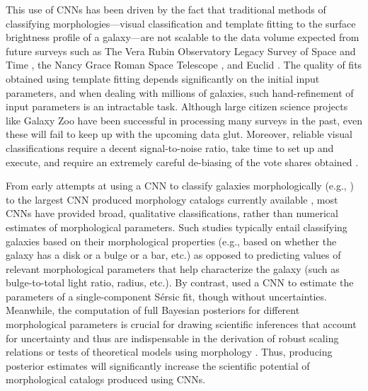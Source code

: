 \documentclass[twocolumn]{aastex63}
\newcommand\sersic{S\'ersic}
\begin{document}
\begin{CJK*}{UTF8}{gbsn}
This use of CNNs has been driven by the fact that traditional methods of classifying morphologies---visual classification and template fitting to the surface brightness profile of a galaxy---are not scalable to the data volume expected from future surveys such as The Vera Rubin Observatory Legacy Survey of Space and Time \citep[LSST;][]{lsst}, the Nancy Grace Roman Space Telescope \citep[NGRST;][]{ngrst}, and Euclid \citep{euclid}. The quality of fits obtained using template fitting depends significantly on the initial input parameters, and when dealing with millions of galaxies, such hand-refinement of input parameters is an intractable task. Although large citizen science projects like Galaxy Zoo \citep{gzoo_original} have been successful in processing many surveys in the past, even these will fail to keep up with the upcoming data glut. Moreover, reliable visual classifications require a decent signal-to-noise ratio, take time to set up and execute, and require an extremely careful de-biasing of the vote shares obtained \citep[e.g.,][]{gzoo_original,gzoo_candels}. 

From early attempts at using a CNN to classify galaxies morphologically (e.g.,  \citealp{Dieleman2015Rotation-invariantPrediction}) to the largest CNN produced morphology catalogs currently available \citep{Cheng2021GalaxyNetworks, Vega-Ferrero2021PushingSurvey}, most
CNNs have provided broad, qualitative classifications, rather than 
numerical estimates of morphological parameters. Such studies typically entail classifying galaxies based on their morphological properties (e.g., based on whether the galaxy has a disk or a bulge or a bar, etc.) as opposed to predicting values of relevant morphological parameters that help characterize the galaxy (such as bulge-to-total light ratio, radius, etc.).
By contrast, \citet{Tuccillo2018DeepFitting} used a CNN to estimate the parameters of a single-component \sersic{} fit, though  without uncertainties. 
Meanwhile, the computation of full Bayesian posteriors for different morphological parameters is crucial for drawing scientific inferences that account for uncertainty and thus are indispensable in 
the derivation of robust scaling relations  \citep[e.g.,][]{Bernardi2013TheProfile, vanderWel20143D-HST+CANDELS:3} or tests of theoretical models using morphology \citep[e.g.,][]{Schawinski2014TheGalaxies}. Thus, producing posterior estimates will significantly increase the scientific potential of morphological catalogs produced using CNNs.


\end{CJK*}
\end{document}
